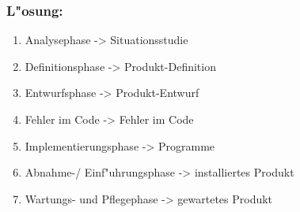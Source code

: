 \subsubsection*{L"osung:}
\begin{enumerate}
  \item Analysephase -> Situationsstudie
  \item Definitionsphase -> Produkt-Definition
  \item Entwurfsphase -> Produkt-Entwurf
  \item Fehler im Code -> Fehler im Code
  \item Implementierungsphase -> Programme
  \item Abnahme-/ Einf"uhrungsphase -> installiertes Produkt
  \item Wartungs- und Pflegephase -> gewartetes Produkt
\end{enumerate}










\clearpage
\setlength\bibitemsep{10pt}
\printbibliography[heading=bibintoc]
\newpage
\printglossary[type=main,title=Glossar]
\printglossary[type=\acronymtype, title=Akronyme]




